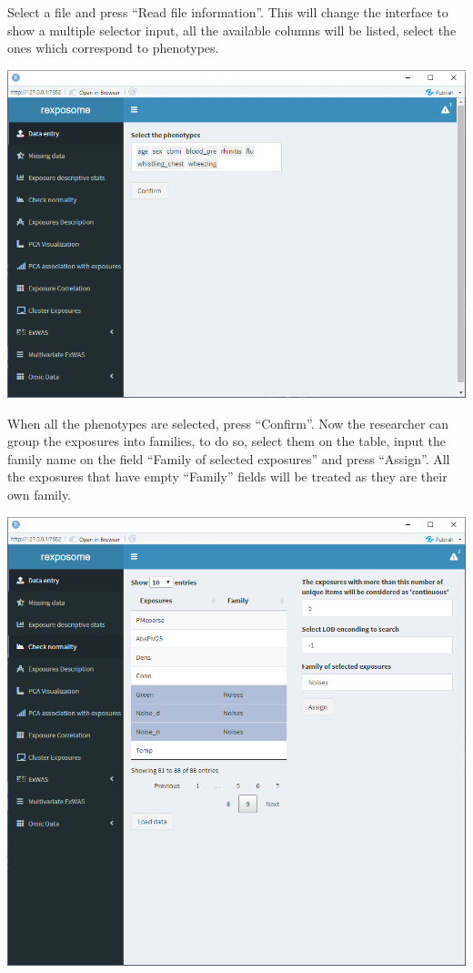 \documentclass[
]{book}
\begin{document}
Select a file and press ``Read file information''. This will change the interface to show a multiple selector input, all the available columns will be listed, select the ones which correspond to phenotypes.

\includegraphics{images/plain_table_2.png}

When all the phenotypes are selected, press ``Confirm''. Now the researcher can group the exposures into families, to do so, select them on the table, input the family name on the field ``Family of selected exposures'' and press ``Assign''. All the exposures that have empty ``Family'' fields will be treated as they are their own family.

\includegraphics{images/plain_table_3.png}
\end{document}
